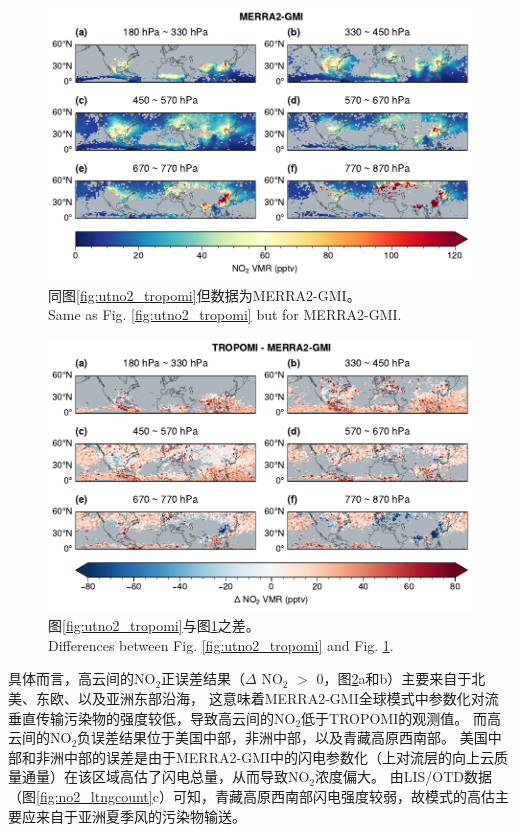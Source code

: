 \begin{figure}[!htbp]
    \centering
    \includegraphics[width=15cm]{./figures/utno2_merra2-gmi.pdf}
    \caption{
    同图\ref{fig:utno2_tropomi}但数据为MERRA2-GMI。 \\
    Same as Fig. \ref{fig:utno2_tropomi} but for MERRA2-GMI.
    }
    \label{fig:utno2_merra2}
\end{figure}

\begin{figure}[!htbp]
    \centering
    \includegraphics[width=15cm]{./figures/utno2_delta.pdf}
    \caption{
    图\ref{fig:utno2_tropomi}与图\ref{fig:utno2_merra2}之差。 \\
    Differences between Fig. \ref{fig:utno2_tropomi} and Fig. \ref{fig:utno2_merra2}.
    }
    \label{fig:utno2_delta}
\end{figure}


具体而言，高云间的NO$_2$正误差结果（$\Delta$ NO$_2$ $>$ 0，图\ref{fig:utno2_delta}a和b）主要来自于北美、东欧、以及亚洲东部沿海，
这意味着MERRA2-GMI全球模式中参数化对流垂直传输污染物的强度较低，导致高云间的NO$_2$低于TROPOMI的观测值。
而高云间的NO$_2$负误差结果位于美国中部，非洲中部，以及青藏高原西南部。
美国中部和非洲中部的误差是由于MERRA2-GMI中的闪电参数化（上对流层的向上云质量通量）在该区域高估了闪电总量，从而导致NO$_2$浓度偏大\citep{Allen.2002,Allen.2010}。
由LIS/OTD数据（图\ref{fig:no2_ltngcount}c）可知，青藏高原西南部闪电强度较弱，故模式的高估主要应来自于亚洲夏季风的污染物输送。

